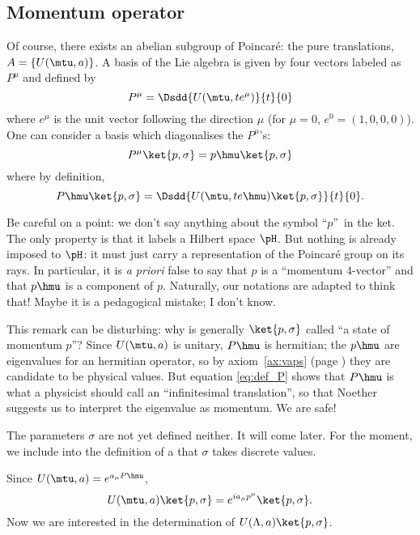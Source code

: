 \subsection{Momentum operator}

Of course, there exists an abelian subgroup of Poincaré: the pure translations, $A=\{U(\mtu,a)\}$. A basis of the Lie algebra is given by four vectors labeled as $P^{\mu}$ and defined by
\[
	P^{\mu}=\Dsdd{U(\mtu,te^{\mu})}{t}{0}
\]
where $e^{\mu}$ is the unit vector following the direction $\mu$ (for $\mu=0$, $e^0=(1,0,0,0)$). One can consider a basis which diagonalises the $P^{\mu}$'s:
\begin{equation}
	P^{\mu}\ket{p,\sigma}=p\hmu\ket{p,\sigma}
\end{equation}
where by definition,
\begin{equation}\label{eq:def_P}
	P\hmu\ket{p,\sigma}=\Dsdd{U(\mtu,te\hmu)\ket{p,\sigma}}{t}{0}.
\end{equation}

\begin{remark}
	Be careful on a point: we don't say anything about the symbol ``$p$''\ in the ket. The only property is that it labels a Hilbert space $\pH$. But nothing is already imposed to $\pH$: it must just carry a representation of the Poincaré group on its rays. In particular, it is \emph{a priori} false to say that $p$ is a ``momentum $4$-vector'' and that $p\hmu$ is a component of $p$. Naturally, our notations are adapted to think that! Maybe it is a pedagogical mistake; I don't know.
\end{remark}

This remark can be disturbing: why is generally $\ket{p,\sigma}$ called ``a state of momentum $p$''? Since $U(\mtu,a)$ is unitary, $P\hmu$ is hermitian; the $p\hmu$ are eigenvalues for an hermitian operator, so by axiom~\ref{ax:vaps} (page \pageref{pg:axiomes}) they are candidate to be physical values. But equation \eqref{eq:def_P} shows that $P\hmu$ is what a physicist should call an ``infinitesimal translation'', so that Noether suggests us to interpret the eigenvalue as momentum. We are safe!

The parameters $\sigma$ are not yet defined neither. It will come later. For the moment, we include into the definition of a  that $\sigma$ takes discrete values.

Since $U(\mtu,a)=e^{a_{\mu} P\hmu}$,
\[
	U(\mtu,a)\ket{p,\sigma}=e^{ia_{\mu} p^{\mu}}\ket{p,\sigma}.
\]
Now we are interested in the determination of $U(\Lambda,a)\ket{p,\sigma}$.

